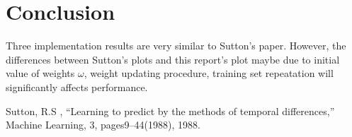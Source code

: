 \documentclass[conference]{IEEEtran}
\begin{document}
\section{Conclusion}

Three implementation results are very similar to Sutton's paper. However, the differences between Sutton's plots and this report's plot maybe due to initial value of weights $\omega$, weight updating procedure, training set repeatation will significantly affects performance.


\begin{thebibliography}{00}
 Sutton, R.S , ``Learning to predict by the methods of temporal differences,'' Machine Learning, 3, pages9–44(1988), 1988.
\end{thebibliography}
\vspace{12pt}
\end{document}
